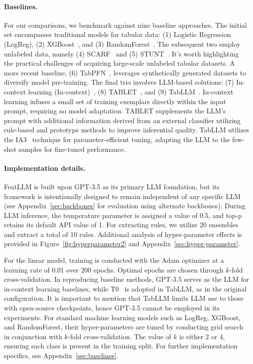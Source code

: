 \vspace*{-0.12in}
\paragraph{Baselines.}
For our comparisons, we benchmark against nine baseline approaches. The initial set encompasses traditional models for tabular data: (1) Logistic Regression (LogReg), (2) XGBoost~\cite{chen2016xgboost}, and (3) RandomForest~\cite{ho1995random}. The subsequent two employ unlabeled data, namely (4) SCARF~\cite{bahri2022scarf} and (5) STUNT~\cite{nam2023stunt}. It's worth highlighting the practical challenges of acquiring large-scale unlabeled tabular datasets. A more recent baseline, (6) TabPFN~\cite{hollmann2022tabpfn}, leverages synthetically generated datasets to diversify model pre-training. The final trio involves LLM-based solutions: (7) In-context learning (In-context)~\cite{wei2022emergent}, (8) TABLET~\cite{slack2023tablet}, and (9) TabLLM~\cite{hegselmann2023tabllm}. In-context learning infuses a small set of training exemplars directly within the input prompt, requiring no model adaptation. TABLET supplements the LLM’s prompt with additional information derived from an external classifier utilizing rule-based and prototype methods to improve inferential quality. TabLLM utilizes the IA3~\cite{liu2022few} technique for parameter-efficient tuning, adapting the LLM to the few-shot samples for fine-tuned performance.

\vspace*{-0.12in}
\paragraph{Implementation details.}
\textsf{FeatLLM} is built upon GPT-3.5 as its primary LLM foundation, but its framework is intentionally designed to remain independent of any specific LLM (see Appendix~\ref{sec:backbones} for evaluation using alternate backbones). During LLM inference, the temperature parameter is assigned a value of 0.5, and top-p retains its default API value of 1. For extracting rules, we utilize 20 ensembles and extract a total of 10 rules. Additional analysis of hyper-parameter effects is provided in Figure~\ref{fig:hyperparameter2} and Appendix~\ref{sec:hyper-parameter}.

For the linear model, training is conducted with the Adam optimizer at a learning rate of 0.01 over 200 epochs. Optimal epochs are chosen through $k$-fold cross-validation. In reproducing baseline methods, GPT-3.5 serves as the LLM for in-context learning baselines, while T0~\cite{sanh2022multitask} is adopted in TabLLM, as in the original configuration. It is important to mention that TabLLM limits LLM use to those with open-source checkpoints, hence GPT-3.5 cannot be employed in its experiments. For standard machine learning models such as LogReg, XGBoost, and RandomForest, their hyper-parameters are tuned by conducting grid search in conjunction with $k$-fold cross-validation. The value of $k$ is either 2 or 4, ensuring each class is present in the training split. For further implementation specifics, see Appendix~\ref{sec:baselines}.

